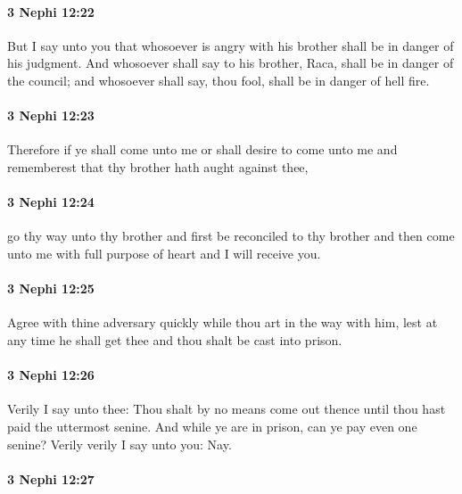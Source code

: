 		\paragraph{3 Nephi 12:22} %
			\label{3NEPHI-12-22}

			But I say unto you
			that whosoever is angry with his brother shall be in danger of his judgment.
			And whosoever shall say to his brother, Raca, shall be in danger of the council;
			and whosoever shall say, thou fool, shall be in danger of hell fire.

		\paragraph{3 Nephi 12:23} %
			\label{3NEPHI-12-23}

			Therefore if ye shall come unto me or shall desire to come unto me
			and rememberest that thy brother hath aught against thee,

		\paragraph{3 Nephi 12:24} %
			\label{3NEPHI-12-24}

			go thy way unto thy brother and first be reconciled to thy brother
			and then come unto me with full purpose of heart and I will receive you.

		\paragraph{3 Nephi 12:25} %
			\label{3NEPHI-12-25}

			Agree with thine adversary quickly
			while thou art in the way with him,
			lest at any time he shall get thee
			and thou shalt be cast into prison.

		\paragraph{3 Nephi 12:26} %
			\label{3NEPHI-12-26}

			Verily I say unto thee:
			Thou shalt by no means come out thence
			until thou hast paid the uttermost senine.
			And while ye are in prison, can ye pay even one senine?
			Verily verily I say unto you: Nay.

		\paragraph{3 Nephi 12:27} %
			\label{3NEPHI-12-27}

